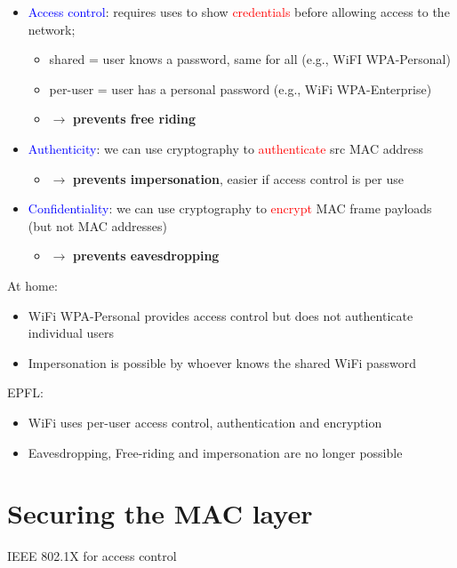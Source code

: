 \documentclass[11pt]{article}
\begin{document}
\begin{itemize}
	\item \textcolor{blue}{Access control}: requires uses to show \textcolor{red}{credentials} before allowing access to the network; 
		\begin{itemize}
			\item shared = user knows a password, same for all (e.g., WiFI WPA-Personal)
			\item per-user = user has a personal password (e.g., WiFi WPA-Enterprise)
 			\item $\rightarrow$ \textbf{prevents free riding}		
		\end{itemize}
	\item \textcolor{blue}{Authenticity}: we can use cryptography to \textcolor{red}{authenticate} src MAC address
		\begin{itemize}
			\item $\rightarrow$ \textbf{prevents impersonation}, easier if access control is per use
		\end{itemize}
	\item \textcolor{blue}{Confidentiality}: we can use cryptography to \textcolor{red}{encrypt} MAC frame payloads (but not MAC addresses)
		\begin{itemize}
			\item $\rightarrow$ \textbf{prevents eavesdropping}
		\end{itemize}
\end{itemize}

At home: 
\begin{itemize}
	\item WiFi WPA-Personal provides access control but does not authenticate individual users
	\item Impersonation is possible by whoever knows the shared WiFi password
\end{itemize}

EPFL:
\begin{itemize}
	\item WiFi uses per-user access control, authentication and encryption
	\item Eavesdropping, Free-riding and impersonation are no longer possible
\end{itemize}

\section*{Securing the MAC layer}

IEEE 802.1X for access control
\end{document}
